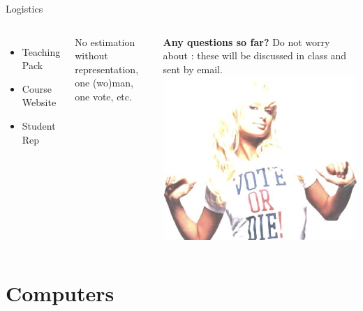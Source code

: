 \documentclass{beamer}
\begin{document}
	\begin{frame}[t]{Logistics}
		\begin{columns}[T]
			
			\begin{itemize}
				\item Teaching Pack
				\item Course Website
				\item Student Rep
			\end{itemize}

			No estimation without representation, one (wo)man, one vote, etc.\vspace{1em}
			
			\textbf{Any questions so far?}\vspace{1em}
			Do not worry about : these will be discussed in class and sent by email.
			\includegraphics[height=.8\textheight]{images/vote.jpg}
		\end{columns}		
	\end{frame}
	
	
	\section{Computers}
\end{document}
